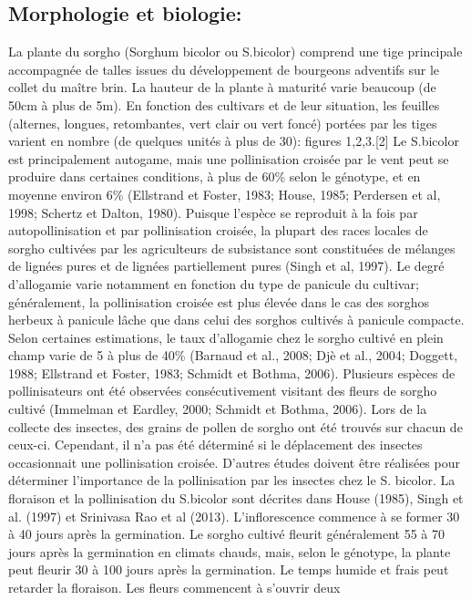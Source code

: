 \documentclass[a4paper,11pt]{article}
\begin{document}
\subsection{Morphologie et biologie:} La plante du sorgho
(Sorghum bicolor ou S.bicolor) comprend une tige principale
accompagnée de talles issues du développement de bourgeons
adventifs sur le collet du maître brin. La hauteur de la plante à
maturité varie beaucoup (de 50cm à plus de 5m). En fonction des
cultivars et de leur situation, les feuilles (alternes, longues,
retombantes, vert clair ou vert foncé) portées par les tiges
varient en nombre (de quelques unités à plus de 30): figures
1,2,3.[2] Le S.bicolor est principalement autogame, mais une
pollinisation croisée par le vent peut se produire dans certaines
conditions, à plus de 60\% selon le génotype, et en moyenne
environ 6\% (Ellstrand et Foster, 1983; House, 1985; Perdersen et
al, 1998; Schertz et Dalton, 1980). Puisque l’espèce se reproduit
à la fois par autopollinisation et par pollinisation croisée, la
plupart des races locales de sorgho cultivées par les
agriculteurs de subsistance sont constituées de mélanges de
lignées pures et de lignées partiellement pures (Singh et al,
1997). Le degré d’allogamie varie notamment en fonction du type
de panicule du cultivar; généralement, la pollinisation croisée
est plus élevée dans le cas des sorghos herbeux à panicule lâche
que dans celui des sorghos cultivés à panicule compacte. Selon
certaines estimations, le taux d’allogamie chez le sorgho cultivé
en plein champ varie de 5 à plus de 40\% (Barnaud et al., 2008;
Djè et al., 2004; Doggett, 1988; Ellstrand et Foster, 1983;
Schmidt et Bothma, 2006). Plusieurs espèces de pollinisateurs ont
été observées consécutivement visitant des fleurs de sorgho
cultivé (Immelman et Eardley, 2000; Schmidt et Bothma,
2006). Lors de la collecte des insectes, des grains de pollen de
sorgho ont été trouvés sur chacun de ceux-ci. Cependant, il n’a
pas été déterminé si le déplacement des insectes occasionnait une
pollinisation croisée. D’autres études doivent être réalisées
pour déterminer l’importance de la pollinisation par les insectes
chez le S. bicolor. La floraison et la pollinisation du S.bicolor
sont décrites dans House (1985), Singh et al. (1997) et Srinivasa
Rao et al (2013). L’inflorescence commence à se former 30 à 40
jours après la germination. Le sorgho cultivé fleurit
généralement 55 à 70 jours après la germination en climats
chauds, mais, selon le génotype, la plante peut fleurir 30 à 100
jours après la germination. Le temps humide et frais peut
retarder la floraison. Les fleurs commencent à s’ouvrir deux
\end{document}
